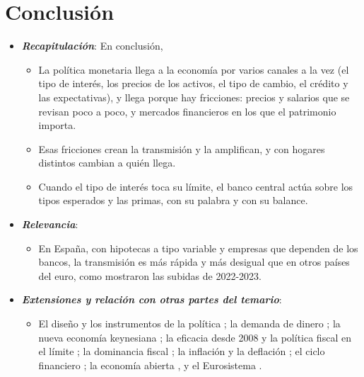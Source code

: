 \documentclass[11pt]{article}
\begin{document}
\begin{infografia}[H]
\centering
\caption{Del límite inferior a la economía: salidas, términos del modelo y canales}\label{figu:no-convencionales-canales}
\end{infografia}

\section*{Conclusión}

\begin{itemize}
\item \textbf{\emph{Recapitulación}}: En conclusión,
  \begin{itemize}
  \item La política monetaria llega a la economía por varios canales a la vez (el tipo de interés, los precios de los activos, el tipo de cambio, el crédito y las expectativas), y llega porque hay fricciones: precios y salarios que se revisan poco a poco, y mercados financieros en los que el patrimonio importa.

  \item Esas fricciones crean la transmisión y la amplifican, y con hogares distintos cambian a quién llega.

  \item Cuando el tipo de interés toca su límite, el banco central actúa sobre los tipos esperados y las primas, con su palabra y con su balance.
  \end{itemize}
\item \textbf{\emph{Relevancia}}:
  \begin{itemize}
  \item En España, con hipotecas a tipo variable y empresas que dependen de los bancos, la transmisión es más rápida y más desigual que en otros países del euro, como mostraron las subidas de 2022-2023\nocite{BCE2026MIR}.
  \end{itemize}
\item \textbf{\emph{Extensiones y relación con otras partes del temario}}:
  \begin{itemize}
  \item El diseño y los instrumentos de la política ; la demanda de dinero ; la nueva economía keynesiana ; la eficacia desde 2008 y la política fiscal en el límite ; la dominancia fiscal ; la inflación y la deflación ; el ciclo financiero ; la economía abierta  , y el Eurosistema .


\end{itemize}
\end{itemize}
\end{document}
